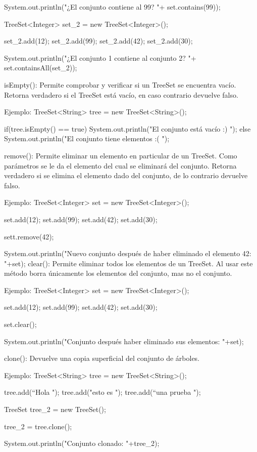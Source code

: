 \documentclass[12pt, letterpaper]{article} %
\begin{document}
System.out.println("¿El conjunto contiene al 99? "+ set.contains(99));


TreeSet<Integer> set_2 = new TreeSet<Integer>();

set_2.add(12);
set_2.add(99);
set_2.add(42);
set_2.add(30);

System.out.println("¿El conjunto 1 contiene al conjunto 2?  "+ set.containsAll(set_2));


isEmpty():
Permite comprobar y verificar si un TreeSet se encuentra vacío. Retorna verdadero si el TreeSet está vacío, en caso contrario devuelve falso.

Ejemplo:
TreeSet<String> tree = new TreeSet<String>();

if(tree.isEmpty() == true){
System.out.println("El conjunto está vacío :) ");
}
else{
	System.out.println("El conjunto tiene elementos :( ");
}


remove():
Permite eliminar un elemento en particular de un TreeSet. Como parámetros se le da el elemento del cual se eliminará del conjunto. Retorna verdadero si se elimina el elemento dado del conjunto, de lo contrario devuelve falso.

Ejemplo:
TreeSet<Integer> set = new TreeSet<Integer>();

set.add(12);
set.add(99);
set.add(42);
set.add(30);

sett.remove(42);

System.out.println("Nuevo conjunto después de haber eliminado el elemento 42: "+set);
clear():
Permite eliminar todos los elementos de un TreeSet. Al usar este método borra únicamente los elementos del conjunto, mas no el conjunto.

Ejemplo:
TreeSet<Integer> set = new TreeSet<Integer>();

set.add(12);
set.add(99);
set.add(42);
set.add(30);

set.clear();

System.out.println("Conjunto después haber eliminado sus elementos: "+set);


clone():
Devuelve una copia superficial del conjunto de árboles.

Ejemplo:
TreeSet<String> tree = new TreeSet<String>();

tree.add(“Hola ");
tree.add("esto es ");
tree.add(“una prueba ");

TreeSet tree_2 = new TreeSet();

tree_2 = tree.clone();

System.out.println("Conjunto clonado: "+tree_2);
\end{document}
